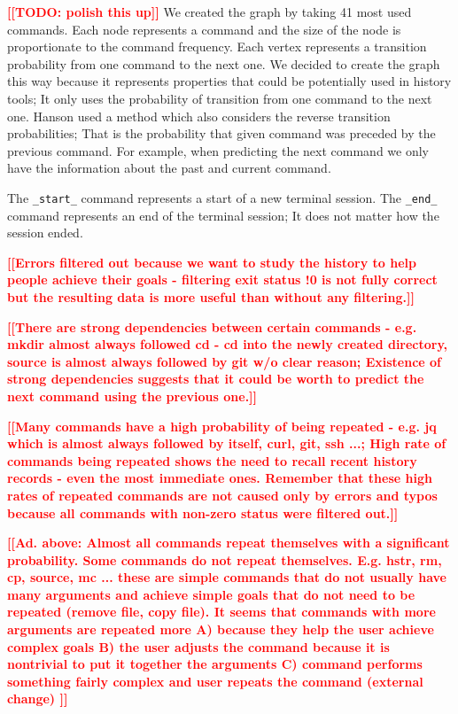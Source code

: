 \documentclass[thesis=M,english]{FITthesis}[2012/10/20]
\newcommand{\todotext}[1]{\textcolor{red}{\textbf{[[#1]]}}}
\begin{document}
\todotext{TODO: polish this up}
We created the graph by taking 41 most used commands. Each node represents a command and the size of the node is proportionate to the command frequency. Each vertex represents a transition probability from one command to the next one. We decided to create the graph this way because it represents properties that could be potentially used in history tools; It only uses the probability of transition from one command to the next one. Hanson used a method which also considers the reverse transition probabilities; That is the probability that given command was preceded by the previous command. For example, when predicting the next command we only have the information about the past and current command. 


The \verb|_start_| command represents a start of a new terminal session.
The \verb|_end_| command represents an end of the terminal session; It does not matter how the session ended.

\todotext{Errors filtered out because we want to study the history to help people achieve their goals - filtering exit status !0 is not fully correct but the resulting data is more useful than without any filtering.}

\todotext{There are strong dependencies between certain commands - e.g. mkdir almost always followed cd - cd into the newly created directory, source is almost always followed by git w/o clear reason; Existence of strong dependencies suggests that it could be worth to predict the next command using the previous one.}

\todotext{Many commands have a high probability of being repeated - e.g. jq which is almost always followed by itself, curl, git, ssh ...; High rate of commands being repeated shows the need to recall recent history records - even the most immediate ones. Remember that these high rates of repeated commands are not caused only by errors and typos because all commands with non-zero status were filtered out.}

\todotext{Ad. above: Almost all commands repeat themselves with a significant probability. Some commands do not repeat themselves. E.g. hstr, rm, cp, source, mc ... these are simple commands that do not usually have many arguments and achieve simple goals that do not need to be repeated (remove file, copy file). It seems that commands with more arguments are repeated more A) because they help the user achieve complex goals B) the user adjusts the command because it is nontrivial to put it together the arguments C) command performs something fairly complex and user repeats the command (external change) }
\end{document}
